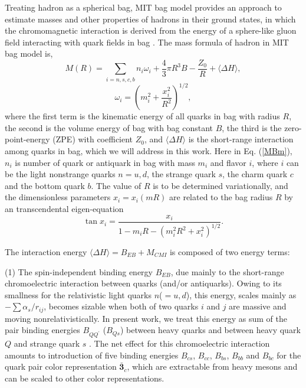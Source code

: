 \documentclass[12pt,prd,onecolumn,floatfix,nofootinbib]{revtex4}
\begin{document}
Treating hadron as a spherical bag, MIT bag model provides an approach to
estimate masses and other properties of hadrons in their ground states\cite%
{Johnson:1975zp,DeGrand:1975cf}, in which the chromomagnetic interaction is
derived from the energy of a sphere-like gluon field interacting with quark
fields in bag \cite{DeGrand:1975cf}. The mass formula of hadron in MIT bag
model is,
\begin{equation}
M\left( R\right) =\sum_{i=n,s,c,b}n_{i}\omega _{i}+\frac{4}{3}\pi R^{3}B-%
\frac{Z_{0}}{R}+\langle \Delta H\rangle ,  \label{MBm}
\end{equation}%
\begin{equation}
\omega _{i}=\left( m_{i}^{2}+\frac{x_{i}^{2}}{R^{2}}\right) ^{1/2},
\label{freq}
\end{equation}%
where the first term is the kinematic energy of all quarks in bag with
radius $R$, the second is the volume energy of bag with bag constant $B$,
the third is the zero-point-energy (ZPE) with coefficient $Z_{0}$, and $%
\langle \Delta H\rangle $ is the short-range interaction among quarks in
bag, which we will address in this work. Here in Eq. (\ref{MBm}), $n_{i}$ is
number of quark or antiquark in bag with mass $m_{i}$ and flavor $i$, where $%
i$ can be the light nonstrange quarks $n=u,d$, the strange quark $s$, the
charm quark $c$ and the bottom quark $b$. The value of $R$ is to be
determined variationally, and the dimensionless parameters $x_{i}=x_{i}(mR)$
are related to the bag radius $R$ by an transcendental eigen-equation
\begin{equation}
\tan x_{i}=\frac{x_{i}}{1-m_{i}R-\left( m_{i}^{2}R^{2}+x_{i}^{2}\right)
^{1/2}}.  \label{transc}
\end{equation}

The interaction energy $\langle \Delta H \rangle=B_{EB}+ M_{CMI}$ is
composed of two energy terms:

(1) The spin-independent binding energy $B_{EB}$, due mainly to the
short-range chromoelectric interaction between quarks (and/or antiquarks).
Owing to its smallness for the relativistic light quarks $n$($=u,d$), this
energy, scales mainly as $-\sum \alpha _{s}/r_{ij}$, becomes sizable when
both of two quarks $i$ and $j$ are massive and moving nonrelativistically.
In present work, we treat this energy as sum of the pair binding energies $%
B_{QQ^{\prime }}$ ($B_{Qs}$) between heavy quarks and between heavy quark $Q$
and strange quark $s$ \cite{KR:2014gca,Karliner:2017elp,Karliner:2018bms}.
The net effect for this chromoelectric interaction amounts to introduction
of five binding energies $B_{cs}$, $B_{cc}$, $B_{bs}$, $B_{bb}$ and $B_{bc}$ 
for the quark pair color representation $\boldsymbol{\bar{3}}_{c}$, which are 
extractable from heavy mesons and can be scaled to other color representations.
\end{document}

